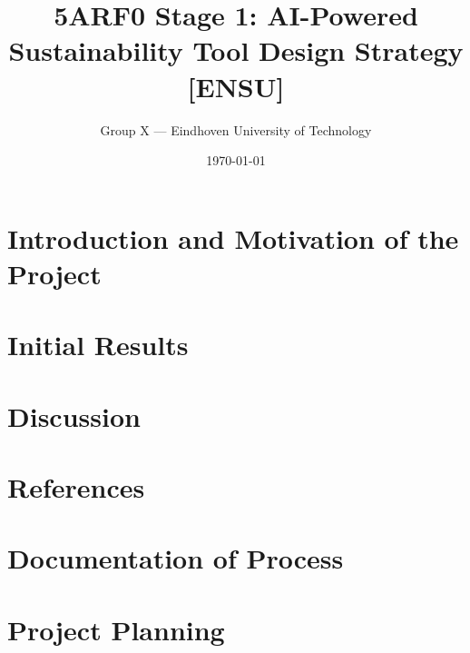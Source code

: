 \documentclass[11pt,a4paper]{article}
\title{5ARF0 Stage 1: AI-Powered Sustainability Tool Design Strategy [ENSU]}
\author{Group X --- Eindhoven University of Technology}
\date{\today}
\begin{document}
\maketitle

\section{Introduction and Motivation of the Project} %
\section{Initial Results} %
\section{Discussion} %
\section{References}

\appendix
\section{Documentation of Process}
\section{Project Planning}
\end{document}
